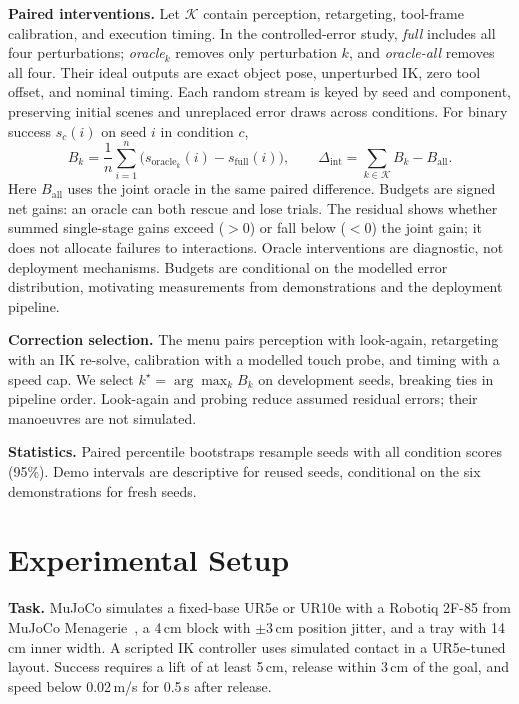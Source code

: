 \documentclass{article}
\begin{document}
\textbf{Paired interventions.} Let $\mathcal{K}$ contain perception, retargeting, tool-frame calibration,
and execution timing. In the controlled-error study, \emph{full} includes all four perturbations;
\emph{oracle}$_k$ removes only perturbation $k$, and \emph{oracle-all} removes all four. Their ideal outputs are exact object pose, unperturbed IK, zero tool offset, and nominal timing. Each random stream is keyed by seed and component, preserving initial scenes and
unreplaced error draws across conditions. For binary success $s_c(i)$ on seed $i$ in condition $c$,
\begin{equation}
 B_k=\frac{1}{n}\sum_{i=1}^{n}\bigl(s_{\mathrm{oracle}_k}(i)-s_{\mathrm{full}}(i)\bigr),
 \qquad \Delta_{\mathrm{int}}=\sum_{k\in\mathcal{K}} B_k-B_{\mathrm{all}}.
\end{equation}
Here $B_{\mathrm{all}}$ uses the joint oracle in the same paired difference. Budgets are signed net gains:
an oracle can both rescue and lose trials. The residual shows whether summed single-stage gains exceed ($>0$) or fall below ($<0$) the joint gain; it does not allocate failures to interactions.
Oracle interventions are diagnostic, not deployment mechanisms. Budgets are conditional on the modelled error distribution, motivating measurements from demonstrations and the deployment pipeline.

\textbf{Correction selection.} The menu pairs perception with look-again, retargeting with an IK re-solve,
calibration with a modelled touch probe, and timing with a speed cap. We select
$k^\star=\arg\max_k B_k$ on development seeds, breaking ties in pipeline order. Look-again and probing reduce assumed residual errors; their manoeuvres are not simulated.

\textbf{Statistics.} Paired percentile bootstraps resample seeds with all condition scores (95\%). Demo intervals are descriptive for reused seeds, conditional on the six demonstrations for fresh seeds.

\section{Experimental Setup}

\textbf{Task.} MuJoCo simulates a fixed-base UR5e or UR10e with a Robotiq 2F-85 from MuJoCo
Menagerie~\citep{menagerie}, a 4\,cm block with $\pm$3\,cm position jitter, and a tray with 14\,cm inner width.
A scripted IK controller uses simulated contact in a UR5e-tuned layout. Success requires a lift of at least 5\,cm, release within 3\,cm of the goal,
and speed below 0.02\,m/s for 0.5\,s after release.
\end{document}
